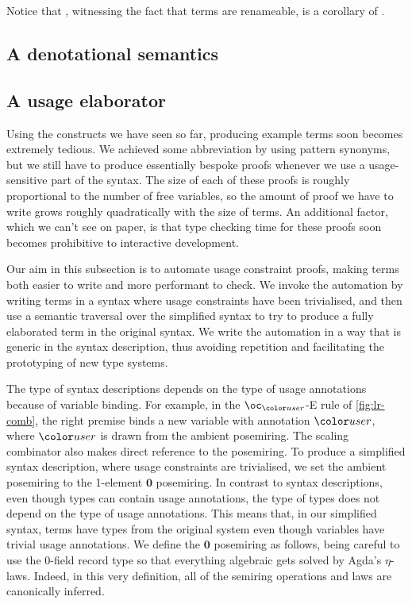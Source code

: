Notice that , witnessing the fact
that terms are renameable, is a corollary of .


\subsection{A denotational semantics}

\subsection{A usage elaborator}

Using the constructs we have seen so far, producing example terms soon becomes
extremely tedious.
We achieved some abbreviation by using pattern synonyms, but we still have to
produce essentially bespoke proofs whenever we use a usage-sensitive part of the
syntax.
The size of each of these proofs is roughly proportional to the number of free
variables, so the amount of proof we have to write grows roughly quadratically
with the size of terms.
An additional factor, which we can't see on paper, is that type checking time
for these proofs soon becomes prohibitive to interactive development.

Our aim in this subsection is to automate usage constraint proofs, making terms
both easier to write and more performant to check.
We invoke the automation by writing terms in a syntax where usage constraints
have been trivialised, and then use a semantic traversal over the simplified
syntax to try to produce a fully elaborated term in the original syntax.
We write the automation in a way that is generic in the syntax description, thus
avoiding repetition and facilitating the prototyping of new type systems.

The type of syntax descriptions depends on the type of usage annotations because
of variable binding.
For example, in the $\oc_{\gr r}$-E rule of \cref{fig:lr-comb}, the right
premise binds a new variable with annotation $\gr r$, where $\gr r$ is drawn
from the ambient posemiring.
The scaling combinator also makes direct reference to the posemiring.
To produce a simplified syntax description, where usage constraints are
trivialised, we set the ambient posemiring to the 1-element $\mathbf0$
posemiring.
In contrast to syntax descriptions, even though types can contain usage
annotations, the type of types does not depend on the type of usage annotations.
This means that, in our simplified syntax, terms have types from the original
system even though variables have trivial usage annotations.
We define the $\mathbf0$ posemiring as follows, being careful to use the
0-field record type \AgdaRecord{$\top$} so that everything algebraic gets
solved by Agda's $\eta$-laws.
Indeed, in this very definition, all of the semiring operations and laws are
canonically inferred.


